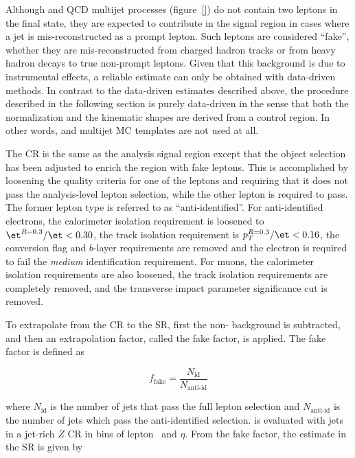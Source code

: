 
Although \wjets and QCD multijet processes (figure~\ref{}) do not contain two
leptons in the final state, they are expected to contribute in the
signal region in cases where a jet is mis-reconstructed as a prompt
lepton.  Such leptons are considered ``fake'', whether they are
mis-reconstructed from charged hadron tracks or from heavy hadron
decays to true non-prompt leptons. Given that this background is due
to instrumental effects, a reliable estimate can only be obtained with
data-driven methods. In contrast to the data-driven estimates
described above, the procedure described in the following section
is purely data-driven in the sense that both the normalization and the
kinematic shapes are derived from a control region. In other words,
\wjets and multijet MC templates are not used at all.

The \wjets CR is the same as the analysis signal region except that
the object selection has been adjusted to enrich the region with fake
leptons. This is accomplished by loosening the quality criteria for
one of the leptons and requiring that it does not pass the analysis-level
lepton selection, while the other lepton is required to pass. The
former lepton type is referred to as ``anti-identified''. For
anti-identified electrons, the calorimeter isolation requirement is
loosened to $\et^{R=0.3}/\et<0.30$, the track isolation requirement
is $p_T^{R=0.3}/\et<0.16$, the conversion flag and $b$-layer
requirements are removed and the electron is required to fail the {\it
  medium} identification requirement. For muons, the calorimeter
isolation requirements are also loosened, the track isolation
requirements are completely removed, and the transverse impact parameter
significance cut is removed.

To extrapolate from the \wjets CR to the SR, first the non-\wjets
background is subtracted, and then an extrapolation factor, called the
fake factor, is applied. The fake factor is defined as

\begin{equation}
\label{chap:analysis:equation:fake_factor}
f_{\textrm{fake}} =
\frac{N_{\textrm{id}}}{N_{\textrm{anti-id}}}
\end{equation}

\noindent
where $N_{\textrm{id}}$ is the number of jets that pass the
full lepton selection and $N_{\textrm{anti-id}}$ is the number
of jets which pass the anti-identified selection. \fakefact is
evaluated with jets in a jet-rich $Z$ CR in bins of lepton \pt~and
$\eta$. From the fake factor, the \wjets estimate in the SR is given
by

